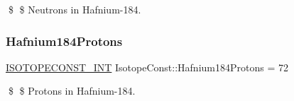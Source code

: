\$ \$ Neutrons in Hafnium-\/184. \mbox{\label{group___isotope_const-_hafnium-_hf184_ga145addbdc33d156a88e6834e1fce72e3}} 
\subsubsection{\texorpdfstring{Hafnium184\+Protons}{Hafnium184Protons}}
{\footnotesize\ttfamily \mbox{\hyperlink{group___isotope_const-_macros_ga5f18360b3e99483a35c32d789e62621c}{I\+S\+O\+T\+O\+P\+E\+C\+O\+N\+S\+T\+\_\+\+I\+NT}} Isotope\+Const\+::\+Hafnium184\+Protons = 72}

\$ \$ Protons in Hafnium-\/184. 